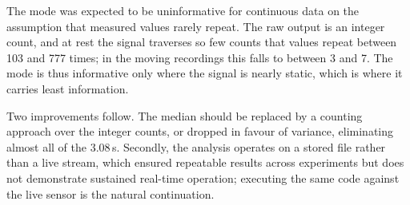 \documentclass[conference]{IEEEtran}
\begin{document}
The mode was expected to be uninformative for continuous data on the assumption
that measured values rarely repeat. The raw output is an integer count, and at
rest the signal traverses so few counts that values repeat between 103 and 777
times; in the moving recordings this falls to between 3 and 7. The mode is thus informative
only where the signal is nearly static, which is where it carries least
information.

Two improvements follow. The median should be replaced by a counting approach
over the integer counts, or dropped in favour of variance, eliminating almost
all of the 3.08\,s. Secondly, the analysis operates on a stored file rather than
a live stream, which ensured repeatable results across experiments but does not
demonstrate sustained real-time operation; executing the same code against the
live sensor is the natural continuation.
\end{document}
